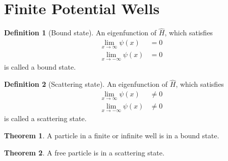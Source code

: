 \documentclass[titlepage, fleqn, a4paper, 12pt, twoside]{article}
\theoremstyle{definition}
\newtheorem{definition}{Definition}
\theoremstyle{theorem}
\newtheorem{theorem}{Theorem}
\let\Oldsection\section
\renewcommand{\section}{\FloatBarrier\Oldsection}
\begin{document}
\section{Finite Potential Wells}

\begin{definition}[Bound state]
	An eigenfunction of $\hat{H}$, which satisfies
	\begin{align*}
		\lim\limits_{x \to \infty} \psi(x) &= 0\\
		\lim\limits_{x \to -\infty} \psi(x) &= 0
	\end{align*}
	is called a bound state.
\end{definition}

\begin{definition}[Scattering state]
	An eigenfunction of $\hat{H}$, which satisfies
	\begin{align*}
		\lim\limits_{x \to \infty} \psi(x) &\neq 0\\
		\lim\limits_{x \to -\infty} \psi(x) &\neq 0
	\end{align*}
	is called a scattering state.
\end{definition}

\begin{theorem}
	A particle in a finite or infinite well is in a bound state.
\end{theorem}

\begin{theorem}
	A free particle is in a scattering state.
\end{theorem}
\end{document}
